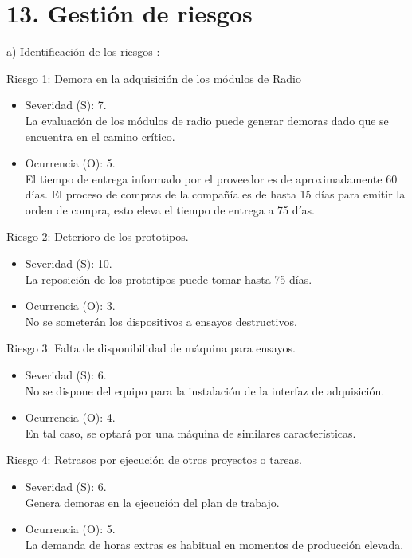 \documentclass[
11pt%
]{charter}
\begin{document}
\section{13. Gestión de riesgos}
\label{sec:riesgos}

a) Identificación de los riesgos :
 
Riesgo 1:  Demora en la adquisición de los módulos de Radio
\begin{itemize}
	\item Severidad (S): 7.\\ La evaluación de los módulos de radio puede generar demoras dado que se encuentra en el camino crítico.
	\item Ocurrencia (O): 5.\\El tiempo de entrega informado por el proveedor es de aproximadamente 60 días. El proceso de compras de la compañía es de hasta 15 días para emitir la orden de compra, esto eleva el tiempo de entrega a 75 días.
\end{itemize}

Riesgo 2: Deterioro de los prototipos.
\begin{itemize}
	\item Severidad (S): 10.\\La reposición de los prototipos puede tomar hasta 75 días.
	\item Ocurrencia (O): 3.\\No se someterán los dispositivos a ensayos destructivos.
\end{itemize}

Riesgo 3: Falta de disponibilidad de máquina para ensayos.
\begin{itemize}
	\item Severidad (S): 6.\\No se dispone del equipo para la instalación de la interfaz de adquisición.
	\item Ocurrencia (O): 4.\\En tal caso, se optará por una máquina de similares características.
\end{itemize}

Riesgo 4: Retrasos por ejecución de otros proyectos o tareas.
\begin{itemize}
	\item Severidad (S): 6.\\Genera demoras en la ejecución del plan de trabajo.
	\item Ocurrencia (O): 5.\\La demanda de horas extras es habitual en momentos de producción elevada.
\end{itemize}
\end{document}
